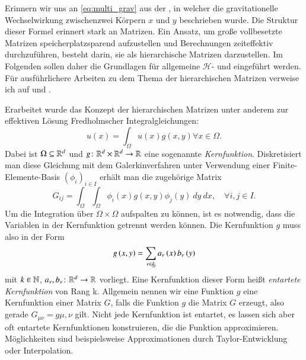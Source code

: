 Erinnern wir uns an \autoref{eq:multi_grav} aus der , in welcher die gravitationelle Wechselwirkung zwischenzwei Körpern $x$ und $y$ beschrieben wurde. 
Die Struktur dieser Formel erinnert stark an Matrizen. 
Ein Ansatz, um große vollbesetzte Matrizen speicherplatzsparend aufzustellen und Berechnungen zeiteffektiv durchzuführen, besteht darin, sie als hierarchische Matrizen darzustellen.
Im Folgenden sollen daher die Grundlagen für allgemeine $\mathcal{H}$- und \hquad eingeführt werden. Für ausführlichere Arbeiten zu dem Thema der hierarchischen Matrizen verweise 
ich auf \citet{h2diss} und \citet{hackbusch1999sparse}.


Erarbeitet wurde das Konzept der hierarchischen Matrizen unter anderem zur effektiven Lösung Fredholmscher Integralgleichungen:
\begin{equation*}
  u\left(x\right) = \int_{\Omega} u\left(x\right) g\left(x, y\right) \forall x \in \Omega .
\end{equation*}
Dabei ist $\Omega \subseteq \mathbb{R}^d$ und $g \colon \mathbb{R}^d \times \mathbb{R}^d \to \mathbb{R}$ eine sogenannte \textit{Kernfunktion}.
Diskretisiert man diese Gleichung mit dem Galerkinverfahren unter Verwendung einer Finite-Elemente-Basis $\left(\phi_i\right)_{i \in I}$ erhält man die zugehörige Matrix
\begin{equation*}
  G_{ij} = \int_{\Omega} \int_{\Omega} \phi_i\left(x\right) g\left(x,y\right) \phi_j\left(y\right) \ dy \ dx ,\quad \forall i, j \in I.
\end{equation*} 
Um die Integration über $\Omega \times \Omega$ aufspalten zu können, ist es notwendig, dass die Variablen in der Kernfunktion getrennt werden können.
Die Kernfunktion $g$ muss also in der Form
\begin{equation*}
  g\left(x,y\right) = \sum_{\nu \in \haken{k}} a_{\nu}\left(x\right) b_{\nu}\left(y\right)
\end{equation*}
mit $k \in \mathbb{N}$, $a_{\nu}, b_{\nu} \colon \mathbb{R}^d \to \mathbb{R}$ vorliegt. Eine Kernfunktion dieser Form heißt \textit{entartete Kernfunktion} von Rang k.
Allgemein nennen wir eine Funktion $g$ eine Kernfunktion einer Matrix $G$, falls die Funktion $g$ die Matrix $G$ erzeugt, also gerade $G_{\mu\nu} = g{\mu, \nu}$ gilt.
Nicht jede Kernfunktion ist entartet, es lassen sich aber oft entartete Kernfunktionen konstruieren, die die Funktion approximieren. Möglichkeiten sind beispielsweise
Approximationen durch Taylor-Entwicklung oder Interpolation. \citep{h2diss}


